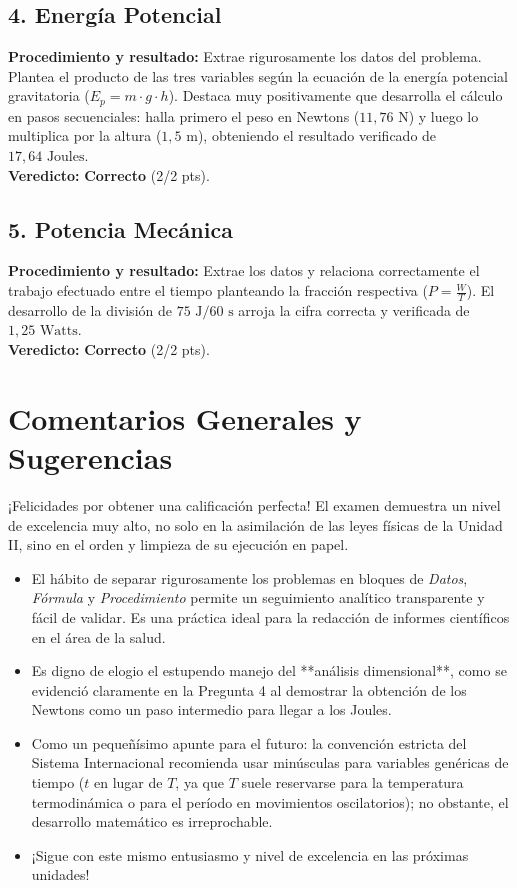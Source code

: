 \documentclass[12pt,letterpaper]{article}
\begin{document}
\subsection*{4. Energía Potencial}
\textbf{Procedimiento y resultado:} Extrae rigurosamente los datos del problema. Plantea el producto de las tres variables según la ecuación de la energía potencial gravitatoria ($E_p = m \cdot g \cdot h$). Destaca muy positivamente que desarrolla el cálculo en pasos secuenciales: halla primero el peso en Newtons ($11,76 \text{ N}$) y luego lo multiplica por la altura ($1,5 \text{ m}$), obteniendo el resultado verificado de $17,64 \text{ Joules}$. \\
\textbf{Veredicto:} \textbf{Correcto} (2/2 pts).

\subsection*{5. Potencia Mecánica}
\textbf{Procedimiento y resultado:} Extrae los datos y relaciona correctamente el trabajo efectuado entre el tiempo planteando la fracción respectiva ($P = \frac{W}{T}$). El desarrollo de la división de $75 \text{ J} / 60 \text{ s}$ arroja la cifra correcta y verificada de $1,25 \text{ Watts}$. \\
\textbf{Veredicto:} \textbf{Correcto} (2/2 pts).

\vspace{0.5cm}
\section*{Comentarios Generales y Sugerencias}
¡Felicidades por obtener una calificación perfecta! El examen demuestra un nivel de excelencia muy alto, no solo en la asimilación de las leyes físicas de la Unidad II, sino en el orden y limpieza de su ejecución en papel.
\begin{itemize}
    \item El hábito de separar rigurosamente los problemas en bloques de \textit{Datos}, \textit{Fórmula} y \textit{Procedimiento} permite un seguimiento analítico transparente y fácil de validar. Es una práctica ideal para la redacción de informes científicos en el área de la salud.
    \item Es digno de elogio el estupendo manejo del **análisis dimensional**, como se evidenció claramente en la Pregunta 4 al demostrar la obtención de los Newtons como un paso intermedio para llegar a los Joules.
    \item Como un pequeñísimo apunte para el futuro: la convención estricta del Sistema Internacional recomienda usar minúsculas para variables genéricas de tiempo ($t$ en lugar de $T$, ya que $T$ suele reservarse para la temperatura termodinámica o para el período en movimientos oscilatorios); no obstante, el desarrollo matemático es irreprochable.
    \item ¡Sigue con este mismo entusiasmo y nivel de excelencia en las próximas unidades!
\end{itemize}
\end{document}
